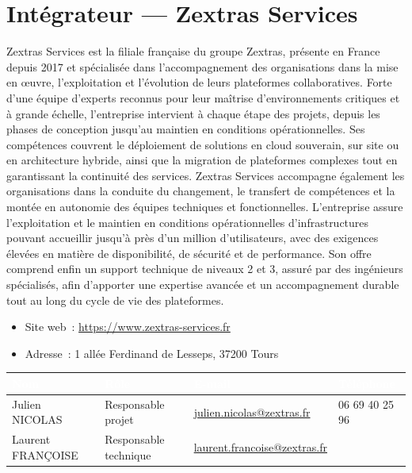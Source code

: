 \documentclass[11pt,a4paper]{report}
\newcommand{\tblhead}[1]{\textcolor{white}{\textbf{#1}}}
\begin{document}
\section{Intégrateur --- Zextras Services}
Zextras Services est la filiale française du groupe Zextras, présente en France depuis 2017 et spécialisée dans l'accompagnement des organisations dans la mise en œuvre, l'exploitation et l'évolution de leurs plateformes collaboratives.\allowbreak{} Forte d'une équipe d'experts reconnus pour leur maîtrise d'environnements critiques et à grande échelle, l'entreprise intervient à chaque étape des projets, depuis les phases de conception jusqu'au maintien en conditions opérationnelles.\allowbreak{} Ses compétences couvrent le déploiement de solutions en cloud souverain, sur site ou en architecture hybride, ainsi que la migration de plateformes complexes tout en garantissant la continuité des services.\allowbreak{} Zextras Services accompagne également les organisations dans la conduite du changement, le transfert de compétences et la montée en autonomie des équipes techniques et fonctionnelles.\allowbreak{} L'entreprise assure l'exploitation et le maintien en conditions opérationnelles d'infrastructures pouvant accueillir jusqu'à près d'un million d'utilisateurs, avec des exigences élevées en matière de disponibilité, de sécurité et de performance.\allowbreak{} Son offre comprend enfin un support technique de niveaux 2 et 3, assuré par des ingénieurs spécialisés, afin d'apporter une expertise avancée et un accompagnement durable tout au long du cycle de vie des plateformes.\allowbreak{}

\begin{itemize}[nosep]
  \item Site web~: \url{https://www.zextras-services.fr }
  \item Adresse~: 1 allée Ferdinand de Lesseps, 37200 Tours
\end{itemize}

\begin{longtable}{|p{3cm}|p{3cm}|p{4.3cm}|p{2.7cm}|}
\hline
\rowcolor{primary}\tblhead{Nom} & \tblhead{Rôle} & \tblhead{E-mail} & \tblhead{Téléphone} \\
\hline
\endhead
Julien NICOLAS & Responsable projet & \href{mailto:julien.nicolas@zextras.fr}{julien.\allowbreak{}nicolas@\allowbreak{}zextras.\allowbreak{}fr} & 06 69 40 25 96 \\
\hline
Laurent FRANÇOISE & Responsable technique & \href{mailto:laurent.francoise@zextras.fr}{laurent.\allowbreak{}francoise@\allowbreak{}zextras.\allowbreak{}fr} &  \\
\hline
\end{longtable}
\end{document}
